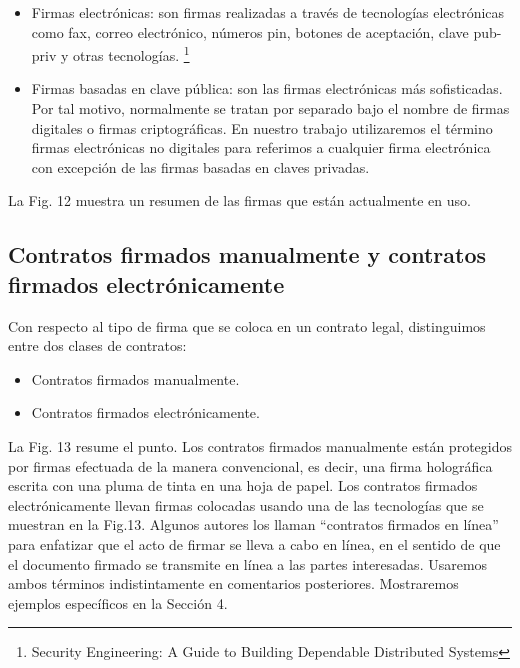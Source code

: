 \documentclass[12pt]{report} %
\begin{document}
\begin{itemize}
\begin{itemize}
    \item Firmas electrónicas: son firmas realizadas a través de tecnologías electrónicas como fax, correo electrónico, números pin, botones de aceptación, clave pub-priv y otras tecnologías. \footnote{\cite{Andersson2020}Security Engineering: A Guide to Building Dependable Distributed Systems}

    \item Firmas basadas en clave pública: son las firmas electrónicas más sofisticadas. Por tal motivo, normalmente se tratan por separado bajo el nombre de firmas digitales o firmas criptográficas. En nuestro trabajo utilizaremos el término firmas electrónicas no digitales para referimos a cualquier firma electrónica con excepción de las firmas basadas en claves privadas.

    \end{itemize}

   La Fig. 12 muestra un resumen de las firmas que están actualmente en uso.


    \subsection{Contratos firmados manualmente y contratos firmados electrónicamente}

Con respecto al tipo de firma que se coloca en un contrato legal, distinguimos entre
dos clases de contratos:

\begin{itemize}
    \item Contratos firmados manualmente.

    \item Contratos firmados electrónicamente.
    
\end{itemize}

La Fig. 13 resume el punto. Los contratos firmados manualmente están protegidos por firmas efectuada de la manera convencional, es decir, una firma holográfica escrita con una pluma de tinta en una hoja de papel. Los contratos firmados electrónicamente llevan firmas colocadas usando una de las tecnologías que se muestran en la Fig.13. Algunos autores los llaman “contratos firmados en línea” para enfatizar que el acto de firmar se lleva a cabo en línea, en el sentido de que el documento firmado se transmite en línea a las partes interesadas. Usaremos ambos términos indistintamente en comentarios posteriores. Mostraremos ejemplos específicos en la Sección 4.


\end{itemize}
\end{document}
